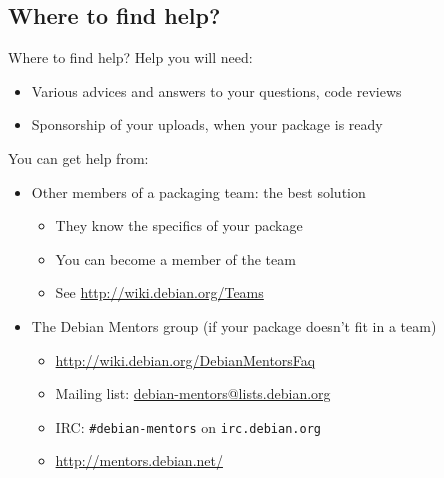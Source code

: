 \documentclass[10pt,final]{beamer}
\begin{document}
\subsection{Where to find help?}
\begin{frame}{Where to find help?}
  Help you will need:
  \begin{itemize}
  \item Various advices and answers to your questions, code reviews
  \item Sponsorship of your uploads, when your package is ready
  \end{itemize}
  \br
  You can get help from:
  \begin{itemize}
  \item Other members of a packaging team: the best solution
    \begin{itemize}
    \item They know the specifics of your package
    \item You can become a member of the team
    \item See \url{http://wiki.debian.org/Teams}
    \end{itemize}
    \hbr
  \item The Debian Mentors group (if your package doesn't fit in a team)
    \begin{itemize}
    \item \url{http://wiki.debian.org/DebianMentorsFaq}
    \item Mailing list: \url{debian-mentors@lists.debian.org}
    \item IRC: \texttt{\#debian-mentors} on \texttt{irc.debian.org}
    \item \url{http://mentors.debian.net/}
    \end{itemize}
  \end{itemize}
\end{frame}
\end{document}

